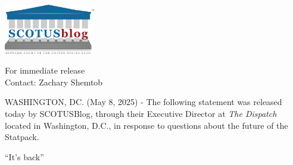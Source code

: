 \newpage

\large


\noindent \includegraphics[width=150px]{images/scotusblog_logo.png}\\[10mm]


\begin{flushright}
For immediate release \\
Contact: Zachary Shemtob
\end{flushright}

\vspace{10mm}

\begin{center}
WASHINGTON, DC. (May 8, 2025) - The following statement was released today by SCOTUSBlog, through their Executive Director at \emph{The Dispatch} located in Washington, D.C., in response to questions about the future of the Statpack. \\

\vspace{10mm}


``It's back''
\end{center}

\vspace{10mm}

